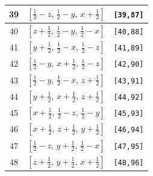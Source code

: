 \documentclass[fleqn,8pt]{jsarticle}
\begin{document}
\begin{longtable}{ccc}
39 & $\left[ \frac{1}{2} - z,\, \frac{1}{2} - y,\, x + \frac{1}{2} \right]$ & {\tt [39,87]} \\ \hline
40 & $\left[ z + \frac{1}{2},\, \frac{1}{2} - y,\, \frac{1}{2} - x \right]$ & {\tt [40,88]} \\ \hline
41 & $\left[ y + \frac{1}{2},\, \frac{1}{2} - x,\, \frac{1}{2} - z \right]$ & {\tt [41,89]} \\ \hline
42 & $\left[ \frac{1}{2} - y,\, x + \frac{1}{2},\, \frac{1}{2} - z \right]$ & {\tt [42,90]} \\ \hline
43 & $\left[ \frac{1}{2} - y,\, \frac{1}{2} - x,\, z + \frac{1}{2} \right]$ & {\tt [43,91]} \\ \hline
44 & $\left[ y + \frac{1}{2},\, x + \frac{1}{2},\, z + \frac{1}{2} \right]$ & {\tt [44,92]} \\ \hline
45 & $\left[ x + \frac{1}{2},\, \frac{1}{2} - z,\, \frac{1}{2} - y \right]$ & {\tt [45,93]} \\ \hline
46 & $\left[ x + \frac{1}{2},\, z + \frac{1}{2},\, y + \frac{1}{2} \right]$ & {\tt [46,94]} \\ \hline
47 & $\left[ \frac{1}{2} - z,\, y + \frac{1}{2},\, \frac{1}{2} - x \right]$ & {\tt [47,95]} \\ \hline
48 & $\left[ z + \frac{1}{2},\, y + \frac{1}{2},\, x + \frac{1}{2} \right]$ & {\tt [48,96]} \\
\end{longtable}
\end{document}
